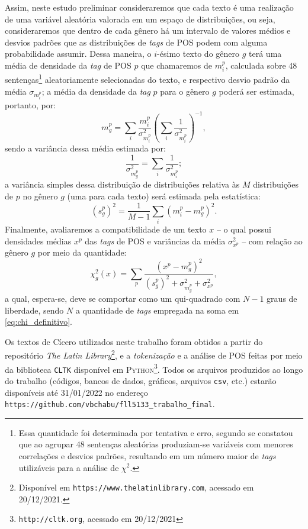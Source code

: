 \documentclass[10pt,a4paper,onecolumn]{article}
\theoremstyle{definition}
\theoremstyle{remark}
\begin{document}
Assim, neste estudo preliminar consideraremos que cada texto é uma realização de uma variável aleatória valorada em um espaço de distribuições, ou seja, consideraremos que dentro de cada gênero há um intervalo de valores médios e desvios padrões que as distribuições de \emph{tags} de POS podem com alguma probabilidade assumir. Dessa maneira, o $i$-ésimo texto do gênero $g$ terá uma média de densidade da \emph{tag} de POS $p$ que chamaremos de $m_i^p$, calculada sobre 48 sentenças\footnote{Essa quantidade foi determinada por tentativa e erro, segundo se constatou que ao agrupar 48 sentenças aleatórias produziam-se variáveis com menores correlações e desvios padrões, resultando em um número maior de \emph{tags} utilizáveis para a análise de $\chi^2$.} aleatoriamente selecionadas do texto, e respectivo desvio padrão da média $\sigma_{m^p_i}$; a média da densidade da \emph{tag} $p$ para o gênero $g$ poderá ser estimada, portanto, por:   
$$m_g^p = \sum_i \frac{m_i^p}{\sigma^2_{m_i^p}} \left( \sum_{i} \frac{1}{\sigma^2_{m_i^p}} \right)^{-1},$$
sendo a variância dessa média estimada por:
$$\frac{1}{\sigma_{m_g^p}^2} = \sum_{i} \frac{1}{\sigma^2_{m_i^p}};$$
a variância simples dessa distribuição de distribuições relativa às $M$ distribuições de $p$ no gênero $g$ (uma para cada texto) será estimada pela estatística:
$$\left(s^p_g\right)^2 = \frac{1}{M-1} \sum_i \left(m^p_i-m^p_g\right)^2.$$
Finalmente, avaliaremos a compatibilidade de um texto $x$ -- o qual possui densidades médias $x^p$ das \emph{tags} de POS e variâncias da média $\sigma_{x^p}^2$ -- com relação ao gênero $g$ por meio da quantidade: 
\begin{equation}\label{eq:chi_definitivo}
\chi^2_g(x) = \sum_p \frac{\left(x^p - m_g^p\right)^2}{\left(s^p_g\right)^2 + \sigma_{m_g^p}^2 + \sigma_{x^p}^2},
\end{equation}
a qual, espera-se, deve se comportar como um qui-quadrado com $N-1$ graus de liberdade, sendo $N$ a quantidade de \emph{tags} empregada na soma em \eqref{eq:chi_definitivo}.

\medskip

Os textos de Cícero utilizados neste trabalho foram obtidos a partir do repositório \emph{The Latin Library}\footnote{Disponível em \texttt{https://www.thelatinlibrary.com}, acessado em 20/12/2021.}, e a \emph{tokenização} e a análise de POS feitas por meio da biblioteca \texttt{CLTK} disponível em \textsc{Python}\footnote{\texttt{http://cltk.org}, acessado em 20/12/2021}. Todos os arquivos produzidos ao longo do trabalho (códigos, bancos de dados, gráficos, arquivos \texttt{csv}, etc.) estarão disponíveis até 31/01/2022 no endereço \texttt{https://github.com/vbchabu/fll5133\_trabalho\_final}.
\end{document}
